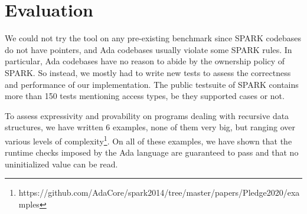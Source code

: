\documentclass[runningheads]{llncs}
\begin{document}
\section{Evaluation}
We could not try the tool on any pre-existing benchmark since SPARK codebases do not have pointers, and Ada codebases usually violate some SPARK rules. In particular, Ada codebases have no reason to abide by the ownership policy of SPARK. So instead, we mostly had to write new tests to assess the correctness and performance of our implementation.
The public testsuite of SPARK contains more than 150 tests mentioning access types, be they supported cases or not.

To assess expressivity and provability on programs dealing with recursive data structures, we have written 6 examples, none of them very big, but ranging over various levels of complexity\footnote{https://github.com/AdaCore/spark2014/tree/master/papers/Pledge2020/examples}.
%
%
%
On all of these examples, we have shown that the runtime checks imposed by the Ada language are guaranteed to pass and that no uninitialized value can be read.
\end{document}
